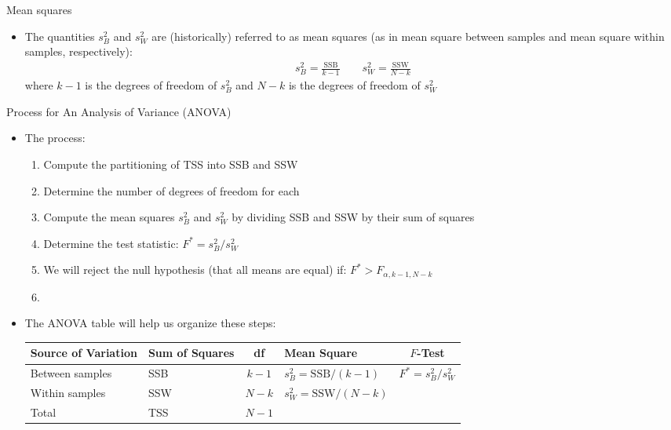 \documentclass[xcolor=dvipsnames]{beamer}
\begin{document}
\begin{frame}{Mean squares}
	\begin{itemize}
		\item The quantities $s^2_B$ and $s^2_W$ are (historically) referred to as mean squares (as in mean square between samples and mean square within samples, respectively):
		\begin{gather*}
			s^2_B = \frac{\text{SSB}}{k-1} \quad \quad s^2_W = \frac{\text{SSW}}{N-k}
		\end{gather*}
		where $k-1$ is the degrees of freedom of $s^2_B$ and $N-k$ is the degrees of freedom of $s^2_W$
	\end{itemize}
\end{frame}

\begin{frame}{Process for An Analysis of Variance (ANOVA)}
	\begin{itemize}
		\item The process:
		\begin{enumerate}
			\item Compute the partitioning of TSS into SSB and SSW
			\item Determine the number of degrees of freedom for each
			\item Compute the mean squares $s_B^2$ and $s_W^2$ by dividing SSB and SSW by their sum of squares
			\item Determine the test statistic: $F^* = s_B^2 / s_W^2$
			\item We will reject the null hypothesis (that all means are equal) if: $F^* > F_{\alpha, k-1, N-k}$
			\item[]
		\end{enumerate}
	\item The ANOVA table will help us organize these steps:
	\vspace{2mm}
	\begin{center}
		{\scriptsize
		\begin{tabular}{lp{1.2cm}cp{2.5cm}c}
			\hline 
			\textbf{Source of Variation} & \textbf{Sum of Squares} & \textbf{df} & \textbf{Mean Square} & $F$-\textbf{Test} \\ \hline 
			Between samples & SSB & $k - 1$ & $s_B^2 = \text{SSB} / (k-1)$ & $F^* = s_B^2 / s_W^2$ \\
			Within samples & SSW & $N - k$ &  $s_W^2 = \text{SSW} / (N-k)$ & \\
			Total & TSS & $N-1$ & & \\ \hline
		\end{tabular}}
	\end{center}
	\end{itemize}
\end{frame}
\end{document}
